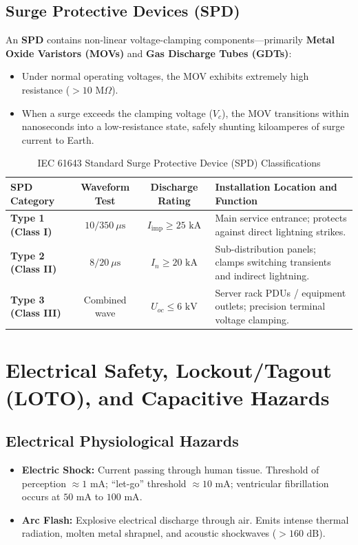 \subsection{Surge Protective Devices (SPD)}
An \textbf{SPD} contains non-linear voltage-clamping components—primarily \textbf{Metal Oxide Varistors (MOVs)} and \textbf{Gas Discharge Tubes (GDTs)}:
\begin{itemize}
    \item Under normal operating voltages, the MOV exhibits extremely high resistance ($>10\text{ M}\Omega$).
    \item When a surge exceeds the clamping voltage ($V_c$), the MOV transitions within nanoseconds into a low-resistance state, safely shunting kiloamperes of surge current to Earth.
\end{itemize}

\begin{table}[htbp]
\centering
\small
\caption{IEC 61643 Standard Surge Protective Device (SPD) Classifications}
\label{tab:spd_classes}
\begin{tabularx}{\textwidth}{l c c X}
\toprule
\textbf{SPD Category} & \textbf{Waveform Test} & \textbf{Discharge Rating} & \textbf{Installation Location and Function} \\
\midrule
\textbf{Type 1 (Class I)} & $10/350\ \mu\text{s}$ & $I_{\text{imp}} \ge 25\text{ kA}$ & Main service entrance; protects against direct lightning strikes. \\
\textbf{Type 2 (Class II)} & $8/20\ \mu\text{s}$ & $I_n \ge 20\text{ kA}$ & Sub-distribution panels; clamps switching transients and indirect lightning. \\
\textbf{Type 3 (Class III)} & Combined wave & $U_{oc} \le 6\text{ kV}$ & Server rack PDUs / equipment outlets; precision terminal voltage clamping. \\
\bottomrule
\end{tabularx}
\end{table}


\section{Electrical Safety, Lockout/Tagout (LOTO), and Capacitive Hazards}
\label{sec:electrical_safety}

\subsection{Electrical Physiological Hazards}
\begin{itemize}
    \item \textbf{Electric Shock:} Current passing through human tissue. Threshold of perception $\approx 1\text{ mA}$; ``let-go'' threshold $\approx 10\text{ mA}$; ventricular fibrillation occurs at $50\text{ mA}$ to $100\text{ mA}$.
    \item \textbf{Arc Flash:} Explosive electrical discharge through air. Emits intense thermal radiation, molten metal shrapnel, and acoustic shockwaves ($>160\text{ dB}$).
\end{itemize}

